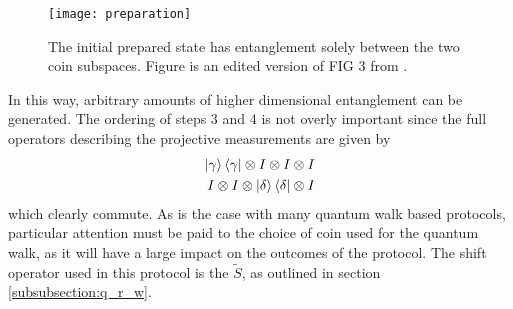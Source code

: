 \begin{figure}
    \centering
    \texttt{[image: preparation]}
    \caption{The initial prepared state has entanglement solely between the two coin subspaces. Figure is an edited version of FIG 3 from \cite{giordani2020}.}
    \label{fig:preparation}
\end{figure}

In this way, arbitrary amounts of higher dimensional entanglement can be generated.
The ordering of steps 3 and 4 is not overly important since the full operators describing the projective measurements are given by
\begin{align}
    \ket{\gamma}\bra{\gamma} \otimes I \otimes I \otimes I\\
    I \otimes I \otimes \ket{\delta}\bra{\delta} \otimes I
\end{align}
which clearly commute.
As is the case with many quantum walk based protocols, particular attention must be paid to the choice of coin used for the quantum walk, as it will have a large impact on the outcomes of the protocol.
The shift operator used in this protocol is the $\tilde{S}$, as outlined in section \ref{subsubsection:q_r_w}.

